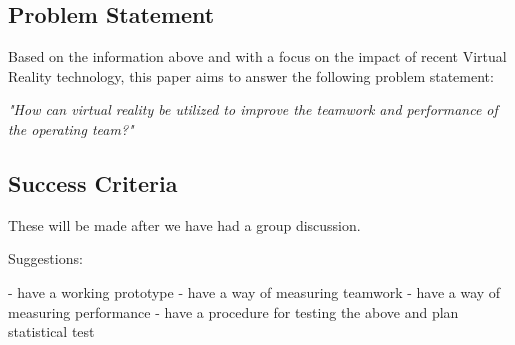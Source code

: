 \documentclass[paper=a4, fontsize=11pt]{scrartcl} %
\numberwithin{equation}{section} %
\numberwithin{figure}{section} %
\numberwithin{table}{section} %
\begin{document}

\subsection{Problem Statement}

Based on the information above and with a focus on the impact of recent Virtual Reality technology, this paper aims to answer the following problem statement:\\

\begin{center}
\emph{\textit{"How can virtual reality be utilized to improve the teamwork and performance of the operating team?"}}
\end{center}


\subsection{Success Criteria}

These will be made after we have had a group discussion. 

Suggestions: 

- have a working prototype
- have a way of measuring teamwork
- have a way of measuring performance
- have a procedure for testing the above and plan statistical test

\end{document}
